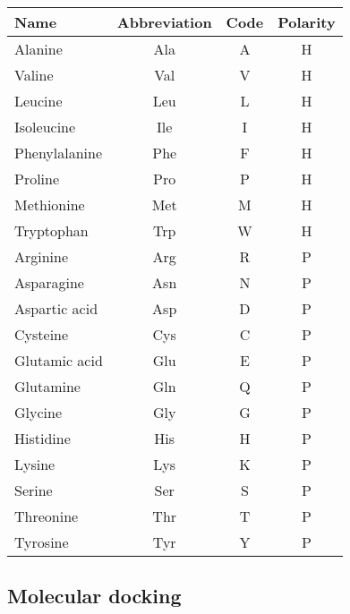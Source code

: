 \begin{center}
\begin{tabular}{|l|ccc|}
\hline
Name          & Abbreviation & Code & Polarity \\
\hline
Alanine       & Ala & A & H \\
Valine        & Val & V & H \\
Leucine       & Leu & L & H \\
Isoleucine    & Ile & I & H \\
Phenylalanine & Phe & F & H \\
Proline       & Pro & P & H \\
Methionine    & Met & M & H \\
Tryptophan    & Trp & W & H \\
\hline
Arginine      & Arg & R & P \\
Asparagine    & Asn & N & P \\
Aspartic acid & Asp & D & P \\
Cysteine      & Cys & C & P \\
Glutamic acid & Glu & E & P \\
Glutamine     & Gln & Q & P \\
Glycine       & Gly & G & P \\
Histidine     & His & H & P \\
Lysine        & Lys & K & P \\
Serine        & Ser & S & P \\
Threonine     & Thr & T & P \\
Tyrosine      & Tyr & Y & P \\
\hline
\end{tabular}
\end{center}

\subsection{Molecular docking}

